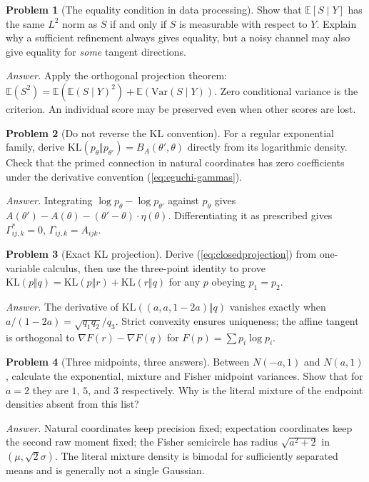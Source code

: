 \documentclass[11pt]{article}
\theoremstyle{definition}\newtheorem{definition}[theorem]{Definition}\newtheorem{exercise}{Problem}[section]
\newcommand{\EE}{\mathbb E}\newcommand{\RR}{\mathbb R}
\newcommand{\KL}{\mathrm{KL}}
\begin{document}
\begin{exercise}[The equality condition in data processing]
Show that $\EE[S\mid Y]$ has the same $L^2$ norm as $S$ if and only if $S$ is measurable with respect to $Y$. Explain why a sufficient refinement always gives equality, but a noisy channel may also give equality for \emph{some} tangent directions.
\end{exercise}
\emph{Answer.} Apply the orthogonal projection theorem: $\EE(S^2)=\EE(\EE(S\mid Y)^2)+\EE(\mathrm{Var}(S\mid Y))$. Zero conditional variance is the criterion. An individual score may be preserved even when other scores are lost.

\begin{exercise}[Do not reverse the KL convention]
For a regular exponential family, derive $\KL(p_\theta\Vert p_{\theta'})=B_A(\theta',\theta)$ directly from its logarithmic density. Check that the primed connection in natural coordinates has zero coefficients under the derivative convention (\ref{eq:eguchi-gammas}).
\end{exercise}
\emph{Answer.} Integrating $\log p_\theta-\log p_{\theta'}$ against $p_\theta$ gives $A(\theta')-A(\theta)-(\theta'-\theta)\cdot\eta(\theta)$. Differentiating it as prescribed gives $\Gamma^*_{ij,k}=0$, $\Gamma_{ij,k}=A_{ijk}$.

\begin{exercise}[Exact KL projection]
Derive (\ref{eq:closedprojection}) from one-variable calculus, then use the three-point identity to prove $\KL(p\Vert q)=\KL(p\Vert r)+\KL(r\Vert q)$ for any $p$ obeying $p_1=p_2$.
\end{exercise}
\emph{Answer.} The derivative of $\KL((a,a,1-2a)\Vert q)$ vanishes exactly when $a/(1-2a)=\sqrt{q_1q_2}/q_3$. Strict convexity ensures uniqueness; the affine tangent is orthogonal to $\nabla F(r)-\nabla F(q)$ for $F(p)=\sum p_i\log p_i$.

\begin{exercise}[Three midpoints, three answers]
Between $N(-a,1)$ and $N(a,1)$, calculate the exponential, mixture and Fisher midpoint variances. Show that for $a=2$ they are $1$, $5$, and $3$ respectively. Why is the literal mixture of the endpoint densities absent from this list?
\end{exercise}
\emph{Answer.} Natural coordinates keep precision fixed; expectation coordinates keep the second raw moment fixed; the Fisher semicircle has radius $\sqrt{a^2+2}$ in $(\mu,\sqrt2\sigma)$. The literal mixture density is bimodal for sufficiently separated means and is generally not a single Gaussian.
\end{document}
